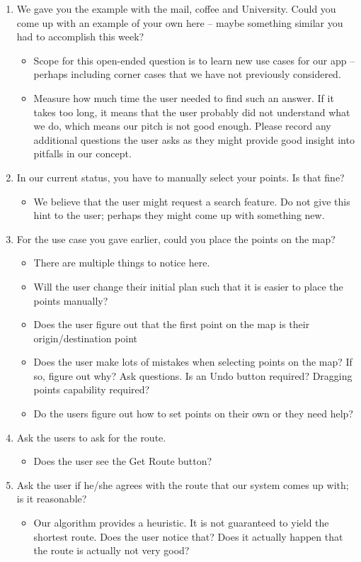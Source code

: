 \documentclass[a4paper, 10pt]{article}
\begin{document}
\begin{enumerate}
\item We gave you the example with the mail, coffee and University. Could you come up with an example of your own here -- maybe something similar you had to accomplish this week?
\begin{itemize}
\item Scope for this open-ended question is to learn new use cases for our app -- perhaps including corner cases that we have not previously considered. 
\item Measure how much time the user needed to find such an answer. If it takes too long, it means that the user probably did not understand what we do, which means our pitch is not good enough. Please record any additional questions the user asks as they might provide good insight into pitfalls in our concept.
\end{itemize}
\item In our current status, you have to manually select your points. Is that fine?
\begin{itemize}
\item We believe that the user might request a search feature. Do not give this hint to the user; perhaps they might come up with something new.
\end{itemize}
\item For the use case you gave earlier, could you place the points on the map?
\begin{itemize}
\item There are multiple things to notice here.
\item Will the user change their initial plan such that it is easier to place the points manually? 
\item Does the user figure out that the first point on the map is their origin/destination point
\item Does the user make lots of mistakes when selecting points on the map? If so, figure out why? Ask questions. Is an Undo button required? Dragging points capability required?
\item Do the users figure out how to set points on their own or they need help?
\end{itemize}
\item Ask the users to ask for the route.
\begin{itemize}
\item Does the user see the Get Route button?
\end{itemize}
\item Ask the user if he/she agrees with the route that our system comes up with; is it reasonable?
\begin{itemize}
\item Our algorithm provides a heuristic. It is not guaranteed to yield the shortest route. Does the user notice that? Does it actually happen that the route is actually not very good?
\end{itemize}
\end{enumerate}
\end{document}
